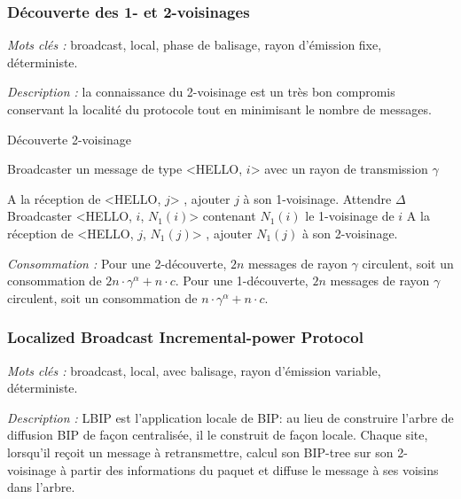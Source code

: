 \subsubsection{Découverte des 1- et 2-voisinages}

\emph{Mots clés :} broadcast, local, phase de balisage, rayon d'émission fixe, déterministe.

\emph{Description :} la connaissance du 2-voisinage est un très bon compromis conservant la localité du protocole tout en minimisant le nombre de messages.


\begin{algorithm}[h]
\caption{Découverte 2-voisinage}
\label{algo_k_voisinage}
\begin{algorithmic}

	\STATE Broadcaster un message de type <HELLO, $i$> avec un rayon de transmission $\gamma$
\ENDFOR

\STATE A la réception de <HELLO, $j$> , ajouter $j$ à son 1-voisinage.
\STATE Attendre $\Delta$
	\STATE Broadcaster <HELLO, $i$, $N_1(i)$> contenant $N_1(i)$ le 1-voisinage de $i$
	\STATE A la réception de <HELLO, $j$, $N_1(j)$> , ajouter $N_1(j)$ à son 2-voisinage.
	
\ENDFOR
\end{algorithmic}
\end{algorithm}

\emph{Consommation :} Pour une 2-découverte, $2n$ messages de rayon $\gamma$ circulent, soit un consommation de $2n\cdot \gamma^\alpha +  n\cdot c$.
Pour une 1-découverte, $2n$ messages de rayon $\gamma$ circulent, soit un consommation de $n\cdot \gamma^\alpha +  n\cdot c$.



\subsubsection{Localized Broadcast Incremental-power Protocol \cite{Ingelrest2004}}
\emph{Mots clés :} broadcast, local, avec balisage, rayon d'émission variable, déterministe.

\emph{Description :} LBIP est l'application locale de BIP: au lieu de construire l'arbre de diffusion BIP de façon centralisée, il le construit de façon locale.
Chaque site, lorsqu'il reçoit un message à retransmettre, calcul son BIP-tree sur son 2-voisinage à partir des informations du paquet et diffuse le message à ses voisins dans l'arbre.


